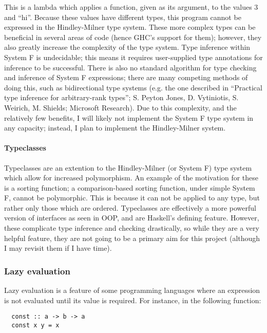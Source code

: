 \documentclass[9pt]{extarticle}
\begin{document}
This is a lambda which applies a function, given as its argument, to the values
3 and ``hi''. Because these values have different types, this program cannot be
expressed in the Hindley-Milner type system. These more complex types can be
beneficial in several areas of code (hence GHC's support for them); however,
they also greatly increase the complexity of the type system. Type inference
within System F is undecidable; this means it requires user-supplied type
annotations for inference to be successful. There is also no standard algorithm
for type checking and inference of System F expressions; there are many
competing methods of doing this, such as bidirectional type systems (e.g. the
one described in ``Practical type inference for arbitrary-rank types''; S. Peyton
Jones, D. Vytiniotis, S. Weirich, M. Shields; Microsoft Research). Due to this
complexity, and the relatively few benefits, I will likely not implement the
System F type system in any capacity; instead, I plan to implement the
Hindley-Milner system.

\paragraph{Typeclasses}

Typeclasses are an extention to the Hindley-Milner (or System F) type system
which allow for increased polymorphism. An example of the motivation for these
is a sorting function; a comparison-based sorting function, under simple System
F, cannot be polymorphic. This is because it can not be applied to any type, but
rather only those which are ordered. Typeclasses are effectively a more powerful
version of interfaces as seen in OOP, and are Haskell's defining feature.
However, these complicate type inference and checking drastically, so while they
are a very helpful feature, they are not going to be a primary aim for this
project (although I may revisit them if I have time).

\subsubsection{Lazy evaluation}

Lazy evaluation is a feature of some programming languages where an
expression is not evaluated until its value is required. For instance,
in the following function:

\begin{verbatim}
  const :: a -> b -> a
  const x y = x
\end{verbatim}
\end{document}
